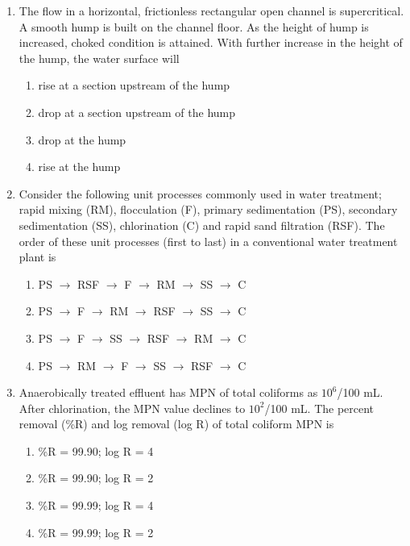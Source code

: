 \documentclass[journal,12pt,onecolumn]{IEEEtran}
\theoremstyle{remark}
\begin{document}
\begin{enumerate}
\item The flow in a horizontal, frictionless rectangular open channel is supercritical. A smooth hump is built on the channel floor. As the height of hump is increased, choked condition is attained. With further increase in the height of the hump, the water surface will

\hfill{}
\begin{enumerate}
\item rise at a section upstream of the hump
\item drop at a section upstream of the hump
\item drop at the hump
\item rise at the hump
\end{enumerate}

\item Consider the following unit processes commonly used in water treatment; rapid mixing (RM), flocculation (F), primary sedimentation (PS), secondary sedimentation (SS), chlorination (C) and rapid sand filtration (RSF). The order of these unit processes (first to last) in a conventional water treatment plant is

\hfill{}
\begin{enumerate}
\item PS $\rightarrow$ RSF $\rightarrow$ F $\rightarrow$ RM $\rightarrow$ SS $\rightarrow$ C
\item PS $\rightarrow$ F $\rightarrow$ RM $\rightarrow$ RSF $\rightarrow$ SS $\rightarrow$ C
\item PS $\rightarrow$ F $\rightarrow$ SS $\rightarrow$ RSF $\rightarrow$ RM $\rightarrow$ C
\item PS $\rightarrow$ RM $\rightarrow$ F $\rightarrow$ SS $\rightarrow$ RSF $\rightarrow$ C
\end{enumerate}

\item Anaerobically treated effluent has MPN of total coliforms as $10^6$/100 mL. After chlorination, the MPN value declines to $10^2$/100 mL. The percent removal (\%R) and log removal (log R) of total coliform MPN is

\hfill{}
\begin{enumerate}
\item \%R = 99.90; log R = 4
\item \%R = 99.90; log R = 2
\item \%R = 99.99; log R = 4
\item \%R = 99.99; log R = 2
\end{enumerate}


\end{enumerate}
\end{document}
